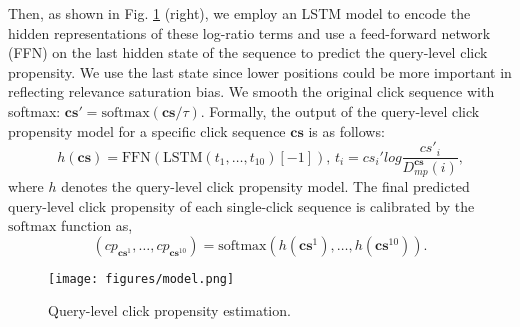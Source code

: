 Then, as shown in Fig. \ref{whole} (right), we employ an LSTM model to encode the hidden representations of these log-ratio terms and use a feed-forward network (FFN) on the last hidden state of the sequence to predict the query-level click propensity. We use the last state since lower positions could be more important in reflecting relevance saturation bias. We smooth the original click sequence with softmax: $\mathbf{cs}'=\textrm{softmax}(\mathbf{cs}/\tau)$. Formally, the output of the query-level click propensity model for a specific click sequence $\mathbf{cs}$ is as follows:
\begin{equation}
\label{qw}
h(\mathbf{cs})\!=\!\textrm{FFN}(\textrm{LSTM}(t_1,\dots,t_{10})[-1])\text{, }t_i\!=\!{cs}_i'log\frac{{cs}'_i}{D_{mp}^{\mathbf{cs}}(i)}\text{,}
\end{equation}
where $h$ denotes the query-level click propensity model. The final predicted query-level click propensity of each single-click sequence is calibrated by the $\textrm{softmax}$ function as,
\begin{equation}
({cp}_{\mathbf{cs}^1},\dots,{cp}_{\mathbf{cs}^{10}})=\textrm{softmax}(h(\mathbf{cs}^1),\dots,h(\mathbf{cs}^{10}))\text{.}
\end{equation}
\begin{figure}[t]
    \centering
    \texttt{[image: figures/model.png]}
    \caption{Query-level click propensity estimation.}
    \label{whole}
\end{figure}
